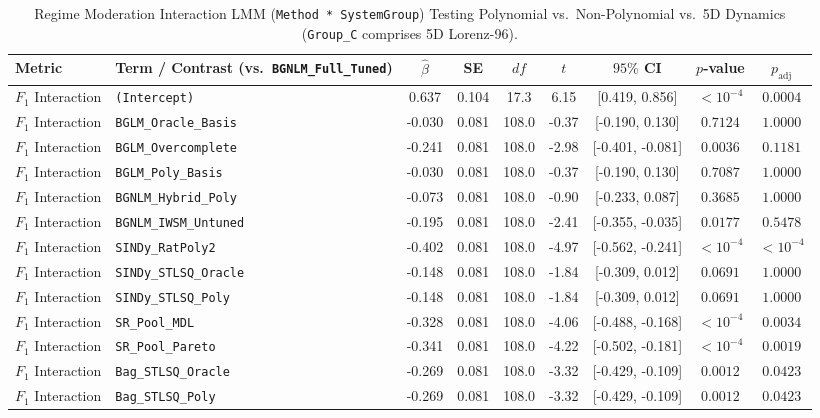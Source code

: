 \begin{table}[t]
\centering
\caption{Regime Moderation Interaction LMM (\texttt{Method * SystemGroup}) Testing Polynomial vs.\ Non-Polynomial vs.\ 5D Dynamics (\texttt{Group\_C} comprises 5D Lorenz-96).}
\label{tab:mixed_effects_regime}
\scriptsize
\setlength{\tabcolsep}{3.5pt}
\renewcommand{\arraystretch}{0.88}
\begin{tabular}{llccccccc}
\toprule
Metric & Term / Contrast (vs.\ \texttt{BGNLM\_Full\_Tuned}) & $\hat{\beta}$ & SE & $df$ & $t$ & $95\%$ CI & $p$-value & $p_{\text{adj}}$ \\
\midrule
$F_1$ Interaction & \texttt{(Intercept)} & 0.637 & 0.104 & 17.3 & 6.15 & [0.419, 0.856] & $< 10^{-4}$ & $0.0004$ \\
$F_1$ Interaction & \texttt{BGLM\_Oracle\_Basis} & -0.030 & 0.081 & 108.0 & -0.37 & [-0.190, 0.130] & $0.7124$ & $1.0000$ \\
$F_1$ Interaction & \texttt{BGLM\_Overcomplete} & -0.241 & 0.081 & 108.0 & -2.98 & [-0.401, -0.081] & $0.0036$ & $0.1181$ \\
$F_1$ Interaction & \texttt{BGLM\_Poly\_Basis} & -0.030 & 0.081 & 108.0 & -0.37 & [-0.190, 0.130] & $0.7087$ & $1.0000$ \\
$F_1$ Interaction & \texttt{BGNLM\_Hybrid\_Poly} & -0.073 & 0.081 & 108.0 & -0.90 & [-0.233, 0.087] & $0.3685$ & $1.0000$ \\
$F_1$ Interaction & \texttt{BGNLM\_IWSM\_Untuned} & -0.195 & 0.081 & 108.0 & -2.41 & [-0.355, -0.035] & $0.0177$ & $0.5478$ \\
$F_1$ Interaction & \texttt{SINDy\_RatPoly2} & -0.402 & 0.081 & 108.0 & -4.97 & [-0.562, -0.241] & $< 10^{-4}$ & $< 10^{-4}$ \\
$F_1$ Interaction & \texttt{SINDy\_STLSQ\_Oracle} & -0.148 & 0.081 & 108.0 & -1.84 & [-0.309, 0.012] & $0.0691$ & $1.0000$ \\
$F_1$ Interaction & \texttt{SINDy\_STLSQ\_Poly} & -0.148 & 0.081 & 108.0 & -1.84 & [-0.309, 0.012] & $0.0691$ & $1.0000$ \\
$F_1$ Interaction & \texttt{SR\_Pool\_MDL} & -0.328 & 0.081 & 108.0 & -4.06 & [-0.488, -0.168] & $< 10^{-4}$ & $0.0034$ \\
$F_1$ Interaction & \texttt{SR\_Pool\_Pareto} & -0.341 & 0.081 & 108.0 & -4.22 & [-0.502, -0.181] & $< 10^{-4}$ & $0.0019$ \\
$F_1$ Interaction & \texttt{Bag\_STLSQ\_Oracle} & -0.269 & 0.081 & 108.0 & -3.32 & [-0.429, -0.109] & $0.0012$ & $0.0423$ \\
$F_1$ Interaction & \texttt{Bag\_STLSQ\_Poly} & -0.269 & 0.081 & 108.0 & -3.32 & [-0.429, -0.109] & $0.0012$ & $0.0423$ \\

\end{tabular}
\end{table}

